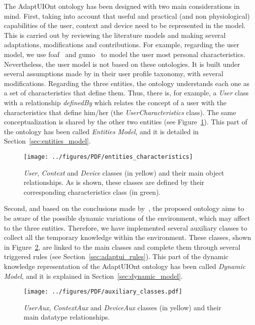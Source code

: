 The AdaptUIOnt ontology has been designed with two main considerations in mind.
First, taking into account that useful and practical (and non physiological)
capabilities of the user, context and device need to be represented in the model.
This is carried out by reviewing the literature models and making several
adaptations, modifications and contributions. For example, regarding the user
model, we use \ac{foaf}~\citep{foaf} and \ac{gumo}~\citep{heckmann_gumogeneral_2005} to
model the user most personal characteristics. Nevertheless, the user model is
not based on these ontologies. It is built under several assumptions made by
\citet{casas_user_2008} in their user profile taxonomy, with several modifications.
Regarding the three entities, the ontology understands each one as a set of
characteristics that define them. Thus, there is, for example, a \textit{User}
class with a relationship \textit{definedBy} which relates the concept of a user
with the characteristics that define him/her (the \textit{UserCharacteristics}
class). The same conceptualization is shared by the other two entities (see
Figure~\ref{fig:entities_characteristics}). This part of the ontology has been
called \textit{Entities Model}, and it is detailed in Section~\ref{sec:entities_model}.



\begin{figure}
\centering
\texttt{[image: ../figures/PDF/entities\_characteristics]}
\caption{\textit{User},
\textit{Context} and \textit{Device} classes (in yellow) and their main object
relationships. As is shown, these classes are defined by their corresponding
characteristics class (in green).}
\label{fig:entities_characteristics}
\end{figure}


Second, and based on the conclusions made by~\citet{gregor_designing_2002},
the proposed ontology aims to be aware of the possible dynamic variations of the
environment, which may affect to the three entities. Therefore, we have implemented
several auxiliary classes to collect all the temporary knowledge within the
environment. These classes, shown in Figure~\ref{fig:auxiliary_classes}, are
linked to the main classes and complete them through several triggered rules
(see Section~\ref{sec:adaptui_rules}). This part of the dynamic knowledge
representation of the AdaptUIOnt ontology has been called \textit{Dynamic Model},
and it is explained in Section~\ref{sec:dynamic_model}.


\begin{figure}
\centering
\texttt{[image: ../figures/PDF/auxiliary\_classes.pdf]}
\caption{\textit{UserAux}, \textit{ContextAux} and \textit{DeviceAux} classes
(in yellow) and their main datatype relationships.}
\label{fig:auxiliary_classes}
\end{figure}

